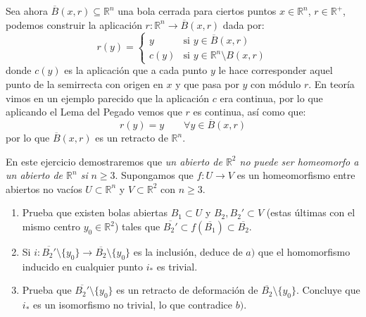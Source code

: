 \begin{ejercicio}
    \noindent
    Sea ahora $\overline{B}(x,r)\subseteq \mathbb{R}^n$  una bola cerrada para ciertos puntos $x\in \mathbb{R}^n$, $r\in \mathbb{R}^+$, podemos construir la aplicación $r:\mathbb{R}^n\to \overline{B}(x,r)$ dada por:
    \begin{equation*}
        r(y) = \left\{\begin{array}{ll}
            y & \text{si\ } y\in \overline{B}(x,r) \\
            c(y) & \text{si\ } y\in \mathbb{R}^n\setminus B(x,r)
        \end{array}\right. 
    \end{equation*}
    donde $c(y)$ es la aplicación que a cada punto $y$ le hace corresponder aquel punto de la semirrecta con origen en $x$ y que pasa por $y$ con módulo $r$. En teoría vimos en un ejemplo parecido que la aplicación $c$ era continua, por lo que aplicando el Lema del Pegado vemos que $r$ es continua, así como que:
    \begin{equation*}
        r(y) = y \qquad \forall y\in \overline{B}(x,r)
    \end{equation*}
    por lo que $\overline{B}(x,r)$ es un retracto de $\mathbb{R}^n$.
\end{ejercicio}

\begin{ejercicio}
    En este ejercicio demostraremos que \textit{un abierto de $\mathbb{R}^2$ no puede ser homeomorfo a un abierto de $\mathbb{R}^n$ si} $n\geq 3$. Supongamos que $f:U\to V$ es un homeomorfismo entre abiertos no vacíos $U\subset \mathbb{R}^n$ y $V\subset \mathbb{R}^2$ con $n\geq 3$.
    \begin{enumerate}[label=\alph*)]
        \item Prueba que existen bolas abiertas $B_1\subset U$ y $B_2,B_2'\subset V$ (estas últimas con el mismo centro $y_0\in \mathbb{R}^2$) tales que $\overline{B_2'}\subset f(\overline{B_1})\subset \overline{B_2}$.
        \item Si $i:\overline{B_2'}\setminus \{y_0\}\to \overline{B_2}\setminus \{y_0\}$ es la inclusión, deduce de $a)$ que el homomorfismo inducido en cualquier punto $i_\ast$ es trivial.
        \item Prueba que $\overline{B_2'}\setminus \{y_0\}$ es un retracto de deformación de $\overline{B_2}\setminus \{y_0\}$. Concluye que $i_\ast$ es un isomorfismo no trivial, lo que contradice $b)$.
    \end{enumerate}
\end{ejercicio}

